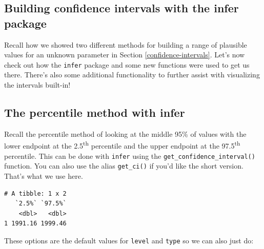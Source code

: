 \documentclass[12pt, krantz2,]{krantz}
\makeatletter
\newenvironment{Shaded}{\begin{snugshade}}{\end{snugshade}}
\newcommand{\DataTypeTok}[1]{\textcolor[rgb]{0.27,0.27,0.27}{#1}}
\newcommand{\FloatTok}[1]{\textcolor[rgb]{0.06,0.06,0.06}{#1}}
\newcommand{\KeywordTok}[1]{\textcolor[rgb]{0.27,0.27,0.27}{\textbf{#1}}}
\newcommand{\NormalTok}[1]{#1}
\newcommand{\OperatorTok}[1]{\textcolor[rgb]{0.43,0.43,0.43}{\textbf{#1}}}
\newcommand{\StringTok}[1]{\textcolor[rgb]{0.5,0.5,0.5}{#1}}
\newenvironment{kframe}{%
\medskip{}
\setlength{\fboxsep}{.8em}
 \def\at@end@of@kframe{}%
 \ifinner\ifhmode%
  \def\at@end@of@kframe{\end{minipage}}%
  \begin{minipage}{\columnwidth}%
 \fi\fi%
 \def\FrameCommand##1{\hskip\@totalleftmargin \hskip-\fboxsep
 \colorbox{shadecolor}{##1}\hskip-\fboxsep
     \hskip-\linewidth \hskip-\@totalleftmargin \hskip\columnwidth}%
 \MakeFramed {\advance\hsize-\width
   \@totalleftmargin\z@ \linewidth\hsize
   \@setminipage}}%
 {\par\unskip\endMakeFramed%
 \at@end@of@kframe}
\renewenvironment{Shaded}{\begin{kframe}}{\end{kframe}}
\makeatother
\begin{document}
\hypertarget{infer-ci}{%
\subsection{Building confidence intervals with the infer package}\label{infer-ci}}

Recall how we showed two different methods for building a range of plausible values for an unknown parameter in Section \ref{confidence-intervals}. Let's now check out how the \texttt{infer} package and some new functions were used to get us there. There's also some additional functionality to further assist with visualizing the intervals built-in!

\hypertarget{percentile-method-infer}{%
\subsection{The percentile method with infer}\label{percentile-method-infer}}

Recall the percentile method of looking at the middle 95\% of values with the lower endpoint at the 2.5\textsuperscript{th} percentile and the upper endpoint at the 97.5\textsuperscript{th} percentile. This can be done with \texttt{infer} using the \texttt{get\_confidence\_interval()} function. You can also use the alias \texttt{get\_ci()} if you'd like the short version. That's what we use here.

\begin{Shaded}
\end{Shaded}

\begin{verbatim}
# A tibble: 1 x 2
   `2.5%` `97.5%`
    <dbl>   <dbl>
1 1991.16 1999.46
\end{verbatim}

These options are the default values for \texttt{level} and \texttt{type} so we can also just do:

\begin{Shaded}
\end{Shaded}
\end{document}
